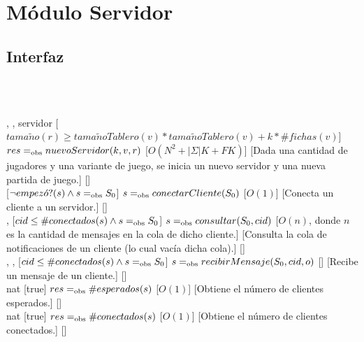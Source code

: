 \section{Módulo Servidor}
\begin{interfaz}{\subsection{Interfaz}}
  \\\\
  \usa{\falta}\par\noindent
  \begin{operaciones}
    {, , }{servidor}
    [$tama\tilde{n}o(r)\geq tama\tilde{n}oTablero(v)*tama\tilde{n}oTablero(v)+k*\#fichas(v)$]
    {$res =_{\mathrm{obs}} nuevoServidor(k,v,r)$}
    [$O(N^{2}+|\Sigma|K+FK)$]
    [Dada una cantidad de jugadores y una variante de juego, se inicia un nuevo servidor y una nueva partida de juego.]
    [\falta]\\

    \noindent{}
    {}{}
    [$\lnot empez\acute{o}?(s) \land s=_{\mathrm{obs}} S_{0}$]
    {$s=_{\mathrm{obs}} conectarCliente(S_{0})$}
    [$O(1)$]
    [Conecta un cliente a un servidor.]
    [\falta]\\

    \noindent{}
    {, }{}
    [$cid\leq \#conectados(s) \land s=_{\mathrm{obs}} S_{0}$]
    {$s=_{\mathrm{obs}} consultar(S_{0},cid)$}
    [$O(n)$, donde $n$ es la cantidad de mensajes en la cola de dicho cliente.]
    [Consulta la cola de notificaciones de un cliente (lo cual vacía dicha cola).]
    [\falta]\\

    \noindent{}
    {, , }{}
    [$cid\leq \#conectados(s) \land s=_{\mathrm{obs}} S_{0}$]
    {$s=_{\mathrm{obs}} recibirMensaje(S_{0},cid,o)$}
    [\falta]
    [Recibe un mensaje de un cliente.]
    [\falta]\\

    \noindent{}
    {}{nat}
    [true]
    {$res=_{\mathrm{obs}} \#esperados(s)$}
    [$O(1)$]
    [Obtiene el número de clientes esperados.]
    [\falta]\\

    \noindent{}
    {}{nat}
    [true]
    {$res=_{\mathrm{obs}} \#conectados(s)$}
    [$O(1)$]
    [Obtiene el número de clientes conectados.]
    [\falta]\\


\end{operaciones}
\end{interfaz}
